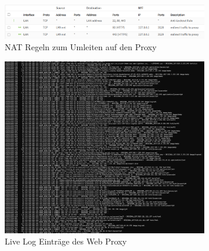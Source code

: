 \documentclass[12pt]{scrreprt}
\begin{document}
\begin{thebibliography}{99}
\begin{figure}[htbp]
	\centering
	\includegraphics[width=0.8\textwidth]{proxyNAT.png}
	\caption{NAT Regeln zum Umleiten auf den Proxy}
	\label{fig:squidproxy} %
\end{figure}

\begin{figure}[htbp]
	\centering
	\includegraphics[width=0.8\textwidth]{squidproxy-log.png}
	\caption{Live Log Einträge des Web Proxy}
	\label{fig:proxylog} %
\end{figure}



	\end{thebibliography}
	\newpage
	
\end{document}
